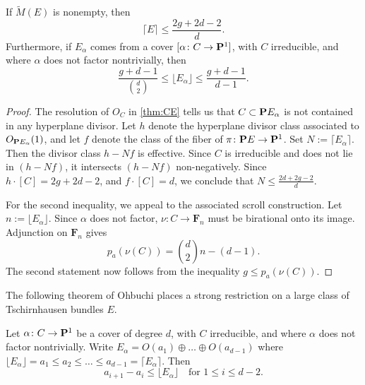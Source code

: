 \documentclass{article}
\renewcommand {\P}{{\bf P}}
\providecommand {\from}{{\colon}}
\newcommand{\td}{\widetilde}
\newcommand{\F}{{\mathbf F}}
\numberwithin{equation}{section}
\begin{document}
\begin{proposition}\label{thm:constraintsE} 
  If $\td M(E)$ is nonempty, then 
  \begin{equation}\label{eqn:highsummand}
    \lceil E \rceil \leq \frac{2g+2d-2}{d}.
  \end{equation}
  Furthermore, if $E_{\alpha}$ comes from a cover $[\alpha \from C \to \P^1]$, with $C$ irreducible, and where $\alpha$ does not factor nontrivially, then
  \begin{equation}\label{eqn:lowsummand}
    \frac{g+d-1}{{d \choose 2}} \leq \lfloor E_{\alpha} \rfloor \leq \frac{g+d-1}{d-1}.
  \end{equation}
\end{proposition}
\begin{proof}
The resolution of $O_C$ in \autoref{thm:CE} tells us that $C \subset \P E_{\alpha}$ is not contained in any hyperplane divisor. Let $h$ denote the hyperplane divisor class associated to $O_{\P E_{\alpha}}(1)$, and let $f$ denote the class of the fiber of $\pi \from \P E \to \P^1$. Set $N := \lceil E_{\alpha} \rceil$.  Then the divisor class $h-Nf$ is effective.  Since $C$ is irreducible and does not lie in $(h-Nf)$, it intersects $(h-Nf)$ non-negatively. Since $h \cdot [C] = 2g+2d-2$, and $f \cdot [C] = d$, we conclude that $N \leq \frac{2d+2g-2}{d}$. 

For the second inequality, we appeal to the associated scroll construction.  Let $n := \lfloor E_{\alpha} \rfloor$. Since $\alpha$ does not factor, $\nu \from C \to \F_n$ must be birational onto its image. Adjunction on $\F_n$ gives
\[p_{a}(\nu(C)) = {d \choose 2}n - (d-1).\]
The second statement now follows from the inequality $g \leq p_{a}(\nu(C))$.
\end{proof}

The following theorem of Ohbuchi \cite{ohbuchi:relations} places a strong restriction on a large class of Tschirnhausen bundles $E$.
\begin{proposition}
  \label{thm:ohbuchi}
  Let $\alpha \from C \to \P^1$ be a cover of degree $d$, with $C$ irreducible, and where $\alpha$ does not factor nontrivially. Write $E_{\alpha} = O(a_1) \oplus \dots \oplus O(a_{d-1})$ where $\lfloor E_\alpha \rfloor =  a_1 \leq a_2 \leq \dots \leq a_{d-1} = \lceil E_\alpha \rceil$. 
  Then 
  \begin{equation}\label{eqn:tame}
a_{i+1} - a_{i} \leq \lfloor E_\alpha \rfloor \quad \text{for $1 \leq i \leq d-2$}.
\end{equation}
\end{proposition}
\end{document}

